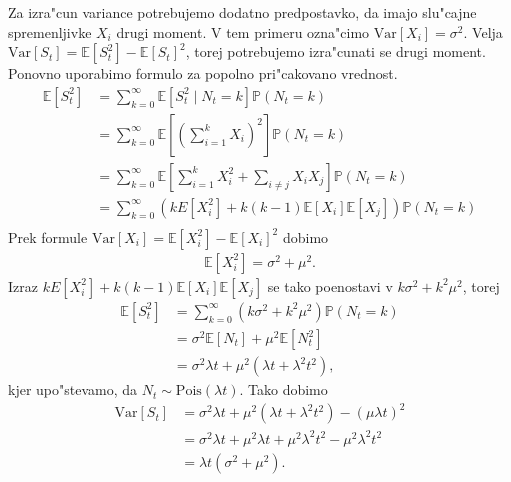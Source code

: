 \documentclass[12pt, a4paper, reqno]{amsart}
\theoremstyle{definition} %
\theoremstyle{plain} %
\newcommand{\E}{\mathbb{E}}
\newcommand{\Prob}{\mathbb{P}}
\newcommand{\1}{\mathds{1}}
\newcommand{\Pois}[1]{\text{Pois}(#1)}
\newcommand{\Var}[1]{\text{Var}\left[#1\right]}
\begin{document}
    \noindent
    Za izra"cun variance potrebujemo dodatno predpostavko, da imajo slu"cajne spremenljivke $X_i$ 
    drugi moment. V tem primeru ozna"cimo $\Var{X_i} = \sigma^2$. Velja 
    $\Var{S_t} = \E\left[S_t^2\right] - \E\left[S_t\right]^2$, torej potrebujemo izra"cunati se 
    drugi moment. Ponovno uporabimo formulo za popolno pri"cakovano vrednost.
    \begin{align*}
        \E\left[S_t^2\right] 
                &= \sum_{k=0}^\infty\E\left[S_t^2\mid N_t = k\right]\Prob\left(N_t=k\right) \\
                &= \sum_{k=0}^\infty\E\left[\left(\sum_{i=1}^kX_i\right)^2\right]\Prob\left(N_t=k\right)\\
                &= \sum_{k=0}^\infty\E\left[\sum_{i=1}^kX_i^2 + \sum_{i\neq j}X_iX_j\right]\Prob\left(N_t=k\right)\\
                &= \sum_{k=0}^\infty\left(kE\left[X_i^2\right] 
                    +k(k-1)\E\left[X_i\right]\E\left[X_j\right]\right)\Prob\left(N_t=k\right)\\
    \end{align*}
    Prek formule $\Var{X_i} = \E\left[X_i^2\right] - \E\left[X_i\right]^2$ dobimo
    \begin{align*}
        \E\left[X_i^2\right] = \sigma^2 + \mu^2.
    \end{align*}
    Izraz $kE\left[X_i^2\right]+k(k-1)\E\left[X_i\right]\E\left[X_j\right]$ se tako poenostavi v 
    $k\sigma^2 + k^2\mu^2$, torej 
    \begin{align*}
        \E\left[S_t^2\right] 
                &= \sum_{k=0}^\infty\left(k\sigma^2 + k^2\mu^2\right)\Prob\left(N_t=k\right)\\
                &= \sigma^2\E\left[N_t\right] + \mu^2\E\left[N_t^2\right]\\
                &= \sigma^2\lambda t + \mu^2(\lambda t + \lambda^2t^2),
    \end{align*}
    kjer upo"stevamo, da $N_t \sim \Pois{\lambda t}$. Tako dobimo
    \begin{align*}
        \Var{S_t} 
                &= \sigma^2\lambda t + \mu^2(\lambda t + \lambda^2t^2) - (\mu\lambda t)^2 \\
                &= \sigma^2\lambda t + \mu^2\lambda t + \mu^2\lambda^2t^2 - \mu^2\lambda^2t^2\\
                &= \lambda t\left(\sigma^2 + \mu^2\right).
    \end{align*}
\end{document}
